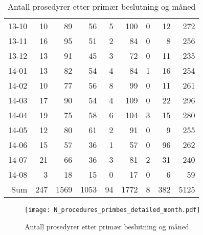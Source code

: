 \documentclass[presentation,xcolor=pdftex,dvipsnames,table]{beamer}
\begin{document}
\begin{frame}
\begin{tiny}
\begin{table}[ht]
\begin{tabular}{rrrrrrrrr}
  13-10 & 10 & 89 & 56 & 5 & 100 & 0 & 12 & 272 \\ 
  13-11 & 16 & 95 & 51 & 2 & 84 & 0 & 8 & 256 \\ 
  13-12 & 13 & 91 & 45 & 3 & 72 & 0 & 11 & 235 \\ 
  14-01 & 13 & 82 & 54 & 4 & 84 & 1 & 16 & 254 \\ 
  14-02 & 10 & 77 & 56 & 8 & 99 & 0 & 11 & 261 \\ 
  14-03 & 17 & 90 & 54 & 4 & 109 & 0 & 22 & 296 \\ 
  14-04 & 19 & 75 & 58 & 6 & 104 & 3 & 15 & 280 \\ 
  14-05 & 12 & 80 & 61 & 2 & 91 & 0 & 9 & 255 \\ 
  14-06 & 15 & 57 & 36 & 1 & 57 & 0 & 96 & 262 \\ 
  14-07 & 21 & 66 & 36 & 3 & 81 & 2 & 31 & 240 \\ 
  14-08 & 3 & 18 & 15 & 0 & 17 & 0 & 6 & 59 \\ 
  Sum & 247 & 1569 & 1053 & 94 & 1772 & 8 & 382 & 5125 \\ 
   \bottomrule
\end{tabular}
\caption{Antall prosedyrer etter primær beslutning og måned} 
\end{table}\end{tiny}
\end{frame}




\begin{frame}
\begin{figure}
  \centering
  \caption{Antall prosedyrer etter primær beslutning og måned}
\texttt{[image: N\_procedures\_primbes\_detailed\_month.pdf]}
\end{figure}\end{frame}
\end{document}
